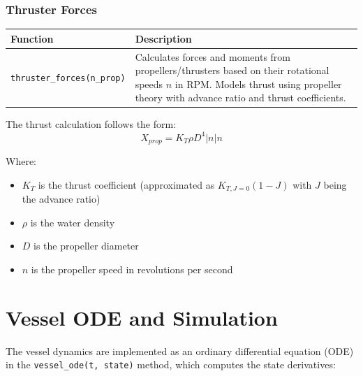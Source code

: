 \documentclass[
  letterpaper,
  DIV=11,
  numbers=noendperiod]{scrreprt}
\providecommand{\tightlist}{%
  \setlength{\itemsep}{0pt}\setlength{\parskip}{0pt}}\usepackage{longtable,booktabs,array}
\begin{document}
\subsubsection*{Thruster Forces}\label{thruster-forces}

\begin{longtable}[]{@{}
  >{\raggedright\arraybackslash}p{}
  >{\raggedright\arraybackslash}p{}@{}}
\toprule\noalign{}
\begin{minipage}[b]{\linewidth}\raggedright
Function
\end{minipage} & \begin{minipage}[b]{\linewidth}\raggedright
Description
\end{minipage} \\
\midrule\noalign{}
\endhead
\bottomrule\noalign{}
\endlastfoot
\texttt{thruster\_forces(n\_prop)} & Calculates forces and moments from
propellers/thrusters based on their rotational speeds \(n\) in RPM.
Models thrust using propeller theory with advance ratio and thrust
coefficients. \\
\end{longtable}

The thrust calculation follows the form:
\[X_{prop} = K_T \rho D^4 |n| n\]

Where:

\begin{itemize}
\tightlist
\item
  \(K_T\) is the thrust coefficient (approximated as \(K_{T,J=0}(1-J)\)
  with \(J\) being the advance ratio)
\item
  \(\rho\) is the water density
\item
  \(D\) is the propeller diameter
\item
  \(n\) is the propeller speed in revolutions per second
\end{itemize}

\section*{Vessel ODE and Simulation}\label{vessel-ode-and-simulation}


The vessel dynamics are implemented as an ordinary differential equation
(ODE) in the \texttt{vessel\_ode(t,\ state)} method, which computes the
state derivatives:
\end{document}
